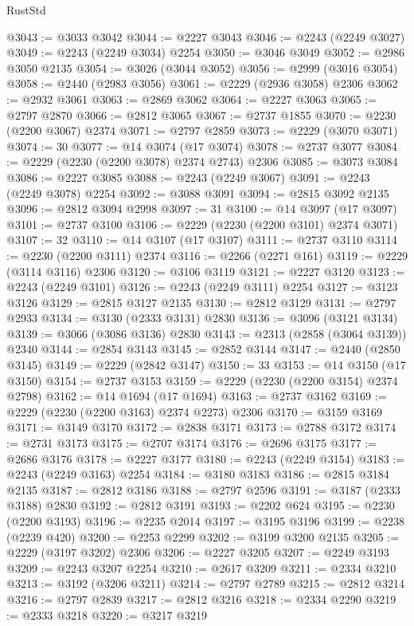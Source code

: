 \begin{lexlean}{RustStd}
\begin{coremodule}
@3043 := @3033 @3042
@3044 := @2227 @3043
@3046 := @2243 (@2249 @3027)
@3049 := @2243 (@2249 @3034) @2254
@3050 := @3046 @3049
@3052 := @2986 @3050 @2135
@3054 := @3026 (@3044 @3052)
@3056 := @2999 (@3016 @3054)
@3058 := @2440 (@2983 @3056)
@3061 := @2229 (@2936 @3058) @2306
@3062 := @2932 @3061
@3063 := @2869 @3062
@3064 := @2227 @3063
@3065 := @2797 @2870
@3066 := @2812 @3065
@3067 := @2737 @1855
@3070 := @2230 (@2200 @3067) @2374
@3071 := @2797 @2859
@3073 := @2229 (@3070 @3071)
@3074 := 30
@3077 := @14 @3074 (@17 @3074)
@3078 := @2737 @3077
@3084 := @2229 (@2230 (@2200 @3078) @2374 @2743) @2306
@3085 := @3073 @3084
@3086 := @2227 @3085
@3088 := @2243 (@2249 @3067)
@3091 := @2243 (@2249 @3078) @2254
@3092 := @3088 @3091
@3094 := @2815 @3092 @2135
@3096 := @2812 @3094 @2998
@3097 := 31
@3100 := @14 @3097 (@17 @3097)
@3101 := @2737 @3100
@3106 := @2229 (@2230 (@2200 @3101) @2374 @3071)
@3107 := 32
@3110 := @14 @3107 (@17 @3107)
@3111 := @2737 @3110
@3114 := @2230 (@2200 @3111) @2374
@3116 := @2266 (@2271 @161)
@3119 := @2229 (@3114 @3116) @2306
@3120 := @3106 @3119
@3121 := @2227 @3120
@3123 := @2243 (@2249 @3101)
@3126 := @2243 (@2249 @3111) @2254
@3127 := @3123 @3126
@3129 := @2815 @3127 @2135
@3130 := @2812 @3129
@3131 := @2797 @2933
@3134 := @3130 (@2333 @3131) @2830
@3136 := @3096 (@3121 @3134)
@3139 := @3066 (@3086 @3136) @2830
@3143 := @2313 (@2858 (@3064 @3139)) @2340
@3144 := @2854 @3143
@3145 := @2852 @3144
@3147 := @2440 (@2850 @3145)
@3149 := @2229 (@2842 @3147)
@3150 := 33
@3153 := @14 @3150 (@17 @3150)
@3154 := @2737 @3153
@3159 := @2229 (@2230 (@2200 @3154) @2374 @2798)
@3162 := @14 @1694 (@17 @1694)
@3163 := @2737 @3162
@3169 := @2229 (@2230 (@2200 @3163) @2374 @2273) @2306
@3170 := @3159 @3169
@3171 := @3149 @3170
@3172 := @2838 @3171
@3173 := @2788 @3172
@3174 := @2731 @3173
@3175 := @2707 @3174
@3176 := @2696 @3175
@3177 := @2686 @3176
@3178 := @2227 @3177
@3180 := @2243 (@2249 @3154)
@3183 := @2243 (@2249 @3163) @2254
@3184 := @3180 @3183
@3186 := @2815 @3184 @2135
@3187 := @2812 @3186
@3188 := @2797 @2596
@3191 := @3187 (@2333 @3188) @2830
@3192 := @2812 @3191
@3193 := @2202 @624
@3195 := @2230 (@2200 @3193)
@3196 := @2235 @2014
@3197 := @3195 @3196
@3199 := @2238 (@2239 @420)
@3200 := @2253 @2299
@3202 := @3199 @3200 @2135
@3205 := @2229 (@3197 @3202) @2306
@3206 := @2227 @3205
@3207 := @2249 @3193
@3209 := @2243 @3207 @2254
@3210 := @2617 @3209
@3211 := @2334 @3210
@3213 := @3192 (@3206 @3211)
@3214 := @2797 @2789
@3215 := @2812 @3214
@3216 := @2797 @2839
@3217 := @2812 @3216
@3218 := @2334 @2290
@3219 := @2333 @3218
@3220 := @3217 @3219

\end{coremodule}
\end{lexlean}
